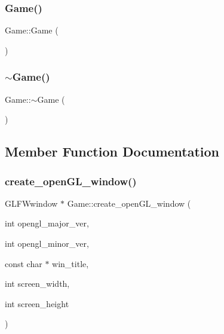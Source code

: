 \subsubsection{\texorpdfstring{Game()}{Game()}}
{\footnotesize\ttfamily Game\+::\+Game (\begin{DoxyParamCaption}{ }\end{DoxyParamCaption})}

\mbox{\label{classGame_ae3d112ca6e0e55150d2fdbc704474530}} 
\subsubsection{\texorpdfstring{$\sim$\+Game()}{~Game()}}
{\footnotesize\ttfamily Game\+::$\sim$\+Game (\begin{DoxyParamCaption}{ }\end{DoxyParamCaption})}



\subsection{Member Function Documentation}
\mbox{\label{classGame_ad25806b818108918a7e5fc5bd71f5de3}} 
\subsubsection{\texorpdfstring{create\+\_\+open\+G\+L\+\_\+window()}{create\_openGL\_window()}}
{\footnotesize\ttfamily G\+L\+F\+Wwindow $\ast$ Game\+::create\+\_\+open\+G\+L\+\_\+window (\begin{DoxyParamCaption}\item[{int}]{opengl\+\_\+major\+\_\+ver,  }\item[{int}]{opengl\+\_\+minor\+\_\+ver,  }\item[{const char $\ast$}]{win\+\_\+title,  }\item[{int}]{screen\+\_\+width,  }\item[{int}]{screen\+\_\+height }\end{DoxyParamCaption})}

\mbox{\label{classGame_a78d191af16100cc28477474bc0b1e2de}} 
